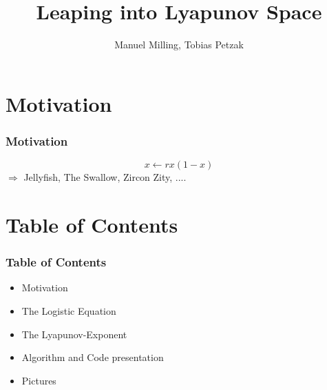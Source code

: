 \documentclass[ignorenonframetext]{beamer}
\title[]{Leaping into Lyapunov Space}
\subtitle{}
\author[Milling, Petzak]{\large{Manuel Milling, Tobias Petzak} \\
}
\institute[Universität Augsburg]{Institut für Physik der Universität Augsburg}
\date[26.08.2016]
\begin{document}
\frame[plain]{\titlepage}

\section*{Motivation}

\begin{frame}
\frametitle{Motivation}
\begin{center}
\begin{equation}
x \leftarrow rx(1-x)
\end{equation}
$ \Rightarrow$ Jellyfish, The Swallow, Zircon Zity, ....
\end{center}

\end{frame}


\section*{Table of Contents}
\begin{frame}
\frametitle{Table of Contents}
\begin{itemize}
\item Motivation
\item The Logistic Equation
\item The Lyapunov-Exponent
\item Algorithm and Code presentation
\item Pictures
\end{itemize}
\end{frame}
\end{document}

